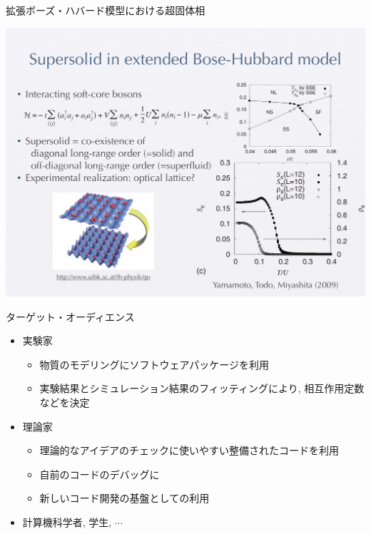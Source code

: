 \begin{frame}[fragile]{拡張ボーズ・ハバード模型における超固体相}
  \begin{center}
    \includegraphics[height=.8\textheight]{supersolid.pdf}
  \end{center}
\end{frame}

\begin{frame}[t,fragile]{ターゲット・オーディエンス}
  \begin{itemize}
    \setlength{\itemsep}{1em}
  \item 実験家
    \begin{itemize}
    \item 物質のモデリングにソフトウェアパッケージを利用
    \item 実験結果とシミュレーション結果のフィッティングにより, 相互作用定数などを決定
    \end{itemize}
  \item 理論家
    \begin{itemize}
    \item 理論的なアイデアのチェックに使いやすい整備されたコードを利用
    \item 自前のコードのデバッグに
    \item 新しいコード開発の基盤としての利用
    \end{itemize}
  \item 計算機科学者, 学生, $\cdots$
  \end{itemize}
\end{frame}


